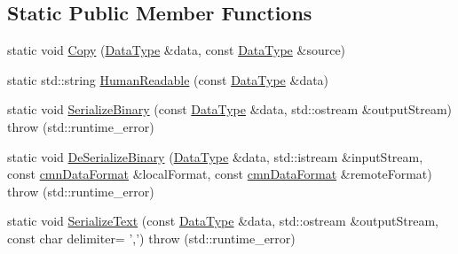 \subsection*{Static Public Member Functions}
\begin{DoxyCompactItemize}
\item 
static void \hyperlink{classcmn_data_3_01vct_fixed_size_vector_3_01__element_type_00_01__size_01_4_01_4_a6d60327eefc877cc557498fcb94bf9b2}{Copy} (\hyperlink{classcmn_data_3_01vct_fixed_size_vector_3_01__element_type_00_01__size_01_4_01_4_ac8ff1c45828cc2add8111e02980f183a}{Data\-Type} \&data, const \hyperlink{classcmn_data_3_01vct_fixed_size_vector_3_01__element_type_00_01__size_01_4_01_4_ac8ff1c45828cc2add8111e02980f183a}{Data\-Type} \&source)
\item 
static std\-::string \hyperlink{classcmn_data_3_01vct_fixed_size_vector_3_01__element_type_00_01__size_01_4_01_4_a3effe8f00f315215c6e1b05544f0f9a2}{Human\-Readable} (const \hyperlink{classcmn_data_3_01vct_fixed_size_vector_3_01__element_type_00_01__size_01_4_01_4_ac8ff1c45828cc2add8111e02980f183a}{Data\-Type} \&data)
\item 
static void \hyperlink{classcmn_data_3_01vct_fixed_size_vector_3_01__element_type_00_01__size_01_4_01_4_a3f99570554b28da956a0e3fb5834609a}{Serialize\-Binary} (const \hyperlink{classcmn_data_3_01vct_fixed_size_vector_3_01__element_type_00_01__size_01_4_01_4_ac8ff1c45828cc2add8111e02980f183a}{Data\-Type} \&data, std\-::ostream \&output\-Stream)  throw (std\-::runtime\-\_\-error)
\item 
static void \hyperlink{classcmn_data_3_01vct_fixed_size_vector_3_01__element_type_00_01__size_01_4_01_4_a0de71af3cc573c2052e6cfbbc2a446bd}{De\-Serialize\-Binary} (\hyperlink{classcmn_data_3_01vct_fixed_size_vector_3_01__element_type_00_01__size_01_4_01_4_ac8ff1c45828cc2add8111e02980f183a}{Data\-Type} \&data, std\-::istream \&input\-Stream, const \hyperlink{classcmn_data_format}{cmn\-Data\-Format} \&local\-Format, const \hyperlink{classcmn_data_format}{cmn\-Data\-Format} \&remote\-Format)  throw (std\-::runtime\-\_\-error)
\item 
static void \hyperlink{classcmn_data_3_01vct_fixed_size_vector_3_01__element_type_00_01__size_01_4_01_4_af1bc79748f67c39e6c812562a965db56}{Serialize\-Text} (const \hyperlink{classcmn_data_3_01vct_fixed_size_vector_3_01__element_type_00_01__size_01_4_01_4_ac8ff1c45828cc2add8111e02980f183a}{Data\-Type} \&data, std\-::ostream \&output\-Stream, const char delimiter= ',')  throw (std\-::runtime\-\_\-error)
\item 

\end{DoxyCompactItemize}
